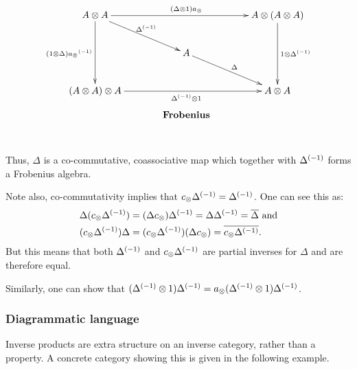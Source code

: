 \[
  \xymatrix @C=40pt @R=25pt{
    A \* A \ar[dd]_{(1\*\Delta) \inv{a_{\*}}} \ar[dr]^{\inv{\Delta}}
    \ar[rr]^{(\Delta \* 1) a_{\*}} & &
    A \* (A \* A) \ar[dd]^{1 \* \inv{\Delta}}\\
    & A \ar[dr]^{\Delta} & \\
    (A \* A) \* A \ar[rr]_{\inv{\Delta} \* 1} & &
    A \* A\\
    &*!<0pc,-25pt>{\text{\textbf{Frobenius}}}
  }
\]

Thus, $\Delta$ is a co-commutative, coassociative map which together with ${\Delta}^{(-1)}$ forms a
Frobenius algebra. 
\begin{remark}
  Note also, co-commutativity implies that $c_{\otimes}{\Delta}^{(-1)} = {\Delta}^{(-1)}$.
  One can see this as:
  \begin{align*}
    \Delta(c_{\otimes}{\Delta}^{(-1)}) 
      &= (\Delta c_{\otimes}){\Delta}^{(-1)} = \Delta{\Delta}^{(-1)} = \overline{\Delta} \text{ and}\\
    (c_{\otimes}{\Delta}^{(-1)})\Delta 
      & = (c_{\otimes}{\Delta}^{(-1)})(\Delta c_{\otimes}) = \overline{c_{\otimes}{\Delta}^{(-1)}}.
  \end{align*}
  But this means that both ${\Delta}^{(-1)}$ and $c_{\otimes}{\Delta}^{(-1)}$ are partial inverses for $\Delta$
  and are therefore equal.
  
  Similarly, one can show that $({\Delta}^{(-1)}\otimes 1){\Delta}^{(-1)} = 
  a_{\otimes}({\Delta}^{(-1)}\otimes 1){\Delta}^{(-1)}$. 
\end{remark}
\subsubsection{Diagrammatic language} %
\label{ssub:diagrammatic_language}



Inverse products are extra structure on an inverse category, rather than a property. A concrete
category showing this is given in the following example.

